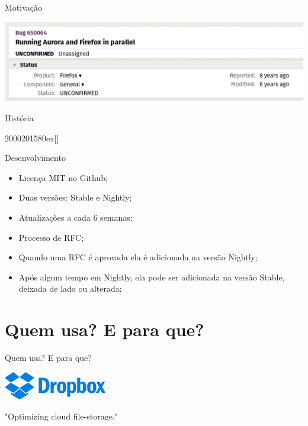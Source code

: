 \documentclass[aspectratio=169]{beamer}
\begin{document}
\begin{frame}{Motivação}
	\begin{center}
		\includegraphics[width=13.5cm]{imgs/bug.png}
	\end{center}
\end{frame}

\begin{frame}{História}
	\begin{chronology}[5]{2000}{2015}{80ex}[\textwidth]
	\end{chronology}
\end{frame}

\begin{frame}{Desenvolvimento}
	\begin{itemize}
		\item Licença MIT no Github;
		\item Duas versões: Stable e Nightly;
		\item Atualizações a cada 6 semanas;
		\item Processo de RFC;
		\item Quando uma RFC é aprovada ela é adicionada na versão Nightly;
		\item Após algum tempo em Nightly, ela pode ser adicionada na versão Stable, deixada de lado ou alterada;	
	\end{itemize}
\end{frame}

\section{Quem usa? E para que?}

\begin{frame}{Quem usa? E para que?}
	\begin{center}
		\includegraphics[width=4.5cm]{imgs/dropbox.png}	
		
		"Optimizing cloud file-storage."
	\end{center}
\end{frame}
\end{document}
